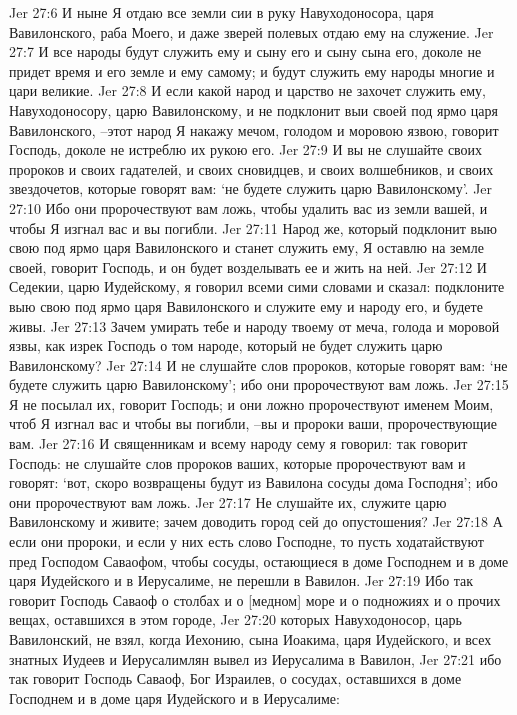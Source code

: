 Jer 27:6  И ныне Я отдаю все земли сии в руку Навуходоносора, царя Вавилонского, раба Моего, и даже зверей полевых отдаю ему на служение.
Jer 27:7  И все народы будут служить ему и сыну его и сыну сына его, доколе не придет время и его земле и ему самому; и будут служить ему народы многие и цари великие.
Jer 27:8  И если какой народ и царство не захочет служить ему, Навуходоносору, царю Вавилонскому, и не подклонит выи своей под ярмо царя Вавилонского, --этот народ Я накажу мечом, голодом и моровою язвою, говорит Господь, доколе не истреблю их рукою его.
Jer 27:9  И вы не слушайте своих пророков и своих гадателей, и своих сновидцев, и своих волшебников, и своих звездочетов, которые говорят вам: `не будете служить царю Вавилонскому'.
Jer 27:10  Ибо они пророчествуют вам ложь, чтобы удалить вас из земли вашей, и чтобы Я изгнал вас и вы погибли.
Jer 27:11  Народ же, который подклонит выю свою под ярмо царя Вавилонского и станет служить ему, Я оставлю на земле своей, говорит Господь, и он будет возделывать ее и жить на ней.
Jer 27:12  И Седекии, царю Иудейскому, я говорил всеми сими словами и сказал: подклоните выю свою под ярмо царя Вавилонского и служите ему и народу его, и будете живы.
Jer 27:13  Зачем умирать тебе и народу твоему от меча, голода и моровой язвы, как изрек Господь о том народе, который не будет служить царю Вавилонскому?
Jer 27:14  И не слушайте слов пророков, которые говорят вам: `не будете служить царю Вавилонскому'; ибо они пророчествуют вам ложь.
Jer 27:15  Я не посылал их, говорит Господь; и они ложно пророчествуют именем Моим, чтоб Я изгнал вас и чтобы вы погибли, --вы и пророки ваши, пророчествующие вам.
Jer 27:16  И священникам и всему народу сему я говорил: так говорит Господь: не слушайте слов пророков ваших, которые пророчествуют вам и говорят: `вот, скоро возвращены будут из Вавилона сосуды дома Господня'; ибо они пророчествуют вам ложь.
Jer 27:17  Не слушайте их, служите царю Вавилонскому и живите; зачем доводить город сей до опустошения?
Jer 27:18  А если они пророки, и если у них есть слово Господне, то пусть ходатайствуют пред Господом Саваофом, чтобы сосуды, остающиеся в доме Господнем и в доме царя Иудейского и в Иерусалиме, не перешли в Вавилон.
Jer 27:19  Ибо так говорит Господь Саваоф о столбах и о [медном] море и о подножиях и о прочих вещах, оставшихся в этом городе,
Jer 27:20  которых Навуходоносор, царь Вавилонский, не взял, когда Иехонию, сына Иоакима, царя Иудейского, и всех знатных Иудеев и Иерусалимлян вывел из Иерусалима в Вавилон,
Jer 27:21  ибо так говорит Господь Саваоф, Бог Израилев, о сосудах, оставшихся в доме Господнем и в доме царя Иудейского и в Иерусалиме:
